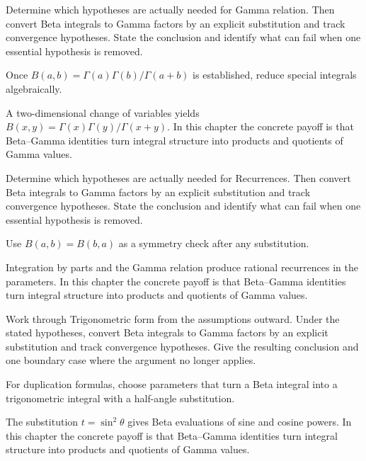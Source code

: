\begin{exercise}\label{exr:iv20-03}
Determine which hypotheses are actually needed for Gamma relation. Then convert Beta integrals to Gamma factors by an explicit substitution and track convergence hypotheses. State the conclusion and identify what can fail when one essential hypothesis is removed.
\end{exercise}
\begin{hint}
Once \(B(a,b)=\Gamma(a)\Gamma(b)/\Gamma(a+b)\) is established, reduce special integrals algebraically.
\end{hint}
\begin{solution}
A two-dimensional change of variables yields $B(x,y)=\Gamma(x)\Gamma(y)/\Gamma(x+y)$. In this chapter the concrete payoff is that Beta--Gamma identities turn integral structure into products and quotients of Gamma values.
\end{solution}

\begin{exercise}\label{exr:iv20-04}
Determine which hypotheses are actually needed for Recurrences. Then convert Beta integrals to Gamma factors by an explicit substitution and track convergence hypotheses. State the conclusion and identify what can fail when one essential hypothesis is removed.
\end{exercise}
\begin{hint}
Use \(B(a,b)=B(b,a)\) as a symmetry check after any substitution.
\end{hint}
\begin{solution}
Integration by parts and the Gamma relation produce rational recurrences in the parameters. In this chapter the concrete payoff is that Beta--Gamma identities turn integral structure into products and quotients of Gamma values.
\end{solution}

\begin{exercise}\label{exr:iv20-05}
Work through Trigonometric form from the assumptions outward. Under the stated hypotheses, convert Beta integrals to Gamma factors by an explicit substitution and track convergence hypotheses. Give the resulting conclusion and one boundary case where the argument no longer applies.
\end{exercise}
\begin{hint}
For duplication formulas, choose parameters that turn a Beta integral into a trigonometric integral with a half-angle substitution.
\end{hint}
\begin{solution}
The substitution $t=\sin^2\theta$ gives Beta evaluations of sine and cosine powers. In this chapter the concrete payoff is that Beta--Gamma identities turn integral structure into products and quotients of Gamma values.
\end{solution}

